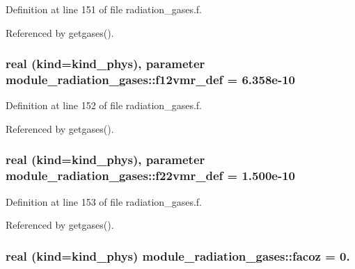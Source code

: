 Definition at line 151 of file radiation\+\_\+gases.\+f.



Referenced by getgases().

\subsubsection[{\texorpdfstring{f12vmr\+\_\+def}{f12vmr_def}}]{\setlength{\rightskip}{0pt plus 5cm}real (kind=kind\+\_\+phys), parameter module\+\_\+radiation\+\_\+gases\+::f12vmr\+\_\+def = 6.\+358e-\/10\hspace{0.3cm}{\ttfamily [private]}}\hypertarget{namespacemodule__radiation__gases_a96d4f78070f30010626e0824b3421250}{}\label{namespacemodule__radiation__gases_a96d4f78070f30010626e0824b3421250}


Definition at line 152 of file radiation\+\_\+gases.\+f.



Referenced by getgases().

\subsubsection[{\texorpdfstring{f22vmr\+\_\+def}{f22vmr_def}}]{\setlength{\rightskip}{0pt plus 5cm}real (kind=kind\+\_\+phys), parameter module\+\_\+radiation\+\_\+gases\+::f22vmr\+\_\+def = 1.\+500e-\/10\hspace{0.3cm}{\ttfamily [private]}}\hypertarget{namespacemodule__radiation__gases_afd0018e96811ac64ef2abd8cab821eb5}{}\label{namespacemodule__radiation__gases_afd0018e96811ac64ef2abd8cab821eb5}


Definition at line 153 of file radiation\+\_\+gases.\+f.



Referenced by getgases().

\subsubsection[{\texorpdfstring{facoz}{facoz}}]{\setlength{\rightskip}{0pt plus 5cm}real (kind=kind\+\_\+phys) module\+\_\+radiation\+\_\+gases\+::facoz = 0.\hspace{0.3cm}{\ttfamily [private]}}\hypertarget{namespacemodule__radiation__gases_ac7c9fd8ece69872fdef473020ea03d6b}{}\label{namespacemodule__radiation__gases_ac7c9fd8ece69872fdef473020ea03d6b}


